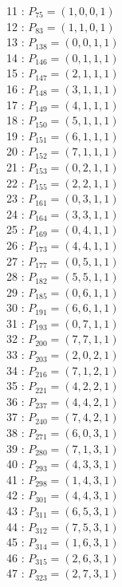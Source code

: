 \documentclass{article}
\begin{document}
{\begin{multicols}{3}
11 : $P_{75}=( 1, 0, 0, 1 )$\\
12 : $P_{83}=( 1, 1, 0, 1 )$\\
13 : $P_{138}=( 0, 0, 1, 1 )$\\
14 : $P_{146}=( 0, 1, 1, 1 )$\\
15 : $P_{147}=( 2, 1, 1, 1 )$\\
16 : $P_{148}=( 3, 1, 1, 1 )$\\
17 : $P_{149}=( 4, 1, 1, 1 )$\\
18 : $P_{150}=( 5, 1, 1, 1 )$\\
19 : $P_{151}=( 6, 1, 1, 1 )$\\
20 : $P_{152}=( 7, 1, 1, 1 )$\\
21 : $P_{153}=( 0, 2, 1, 1 )$\\
22 : $P_{155}=( 2, 2, 1, 1 )$\\
23 : $P_{161}=( 0, 3, 1, 1 )$\\
24 : $P_{164}=( 3, 3, 1, 1 )$\\
25 : $P_{169}=( 0, 4, 1, 1 )$\\
26 : $P_{173}=( 4, 4, 1, 1 )$\\
27 : $P_{177}=( 0, 5, 1, 1 )$\\
28 : $P_{182}=( 5, 5, 1, 1 )$\\
29 : $P_{185}=( 0, 6, 1, 1 )$\\
30 : $P_{191}=( 6, 6, 1, 1 )$\\
31 : $P_{193}=( 0, 7, 1, 1 )$\\
32 : $P_{200}=( 7, 7, 1, 1 )$\\
33 : $P_{203}=( 2, 0, 2, 1 )$\\
34 : $P_{216}=( 7, 1, 2, 1 )$\\
35 : $P_{221}=( 4, 2, 2, 1 )$\\
36 : $P_{237}=( 4, 4, 2, 1 )$\\
37 : $P_{240}=( 7, 4, 2, 1 )$\\
38 : $P_{271}=( 6, 0, 3, 1 )$\\
39 : $P_{280}=( 7, 1, 3, 1 )$\\
40 : $P_{293}=( 4, 3, 3, 1 )$\\
41 : $P_{298}=( 1, 4, 3, 1 )$\\
42 : $P_{301}=( 4, 4, 3, 1 )$\\
43 : $P_{311}=( 6, 5, 3, 1 )$\\
44 : $P_{312}=( 7, 5, 3, 1 )$\\
45 : $P_{314}=( 1, 6, 3, 1 )$\\
46 : $P_{315}=( 2, 6, 3, 1 )$\\
47 : $P_{323}=( 2, 7, 3, 1 )$\\

\end{multicols}}
\end{document}
